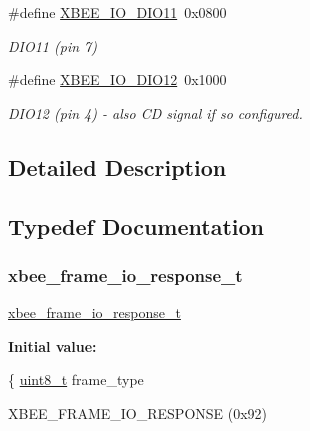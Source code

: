 \begin{DoxyCompactItemize}
\#define \hyperlink{group__xbee__io_ga7c1e80d3412af7f1218b981c5c4e3702}{X\+B\+E\+E\+\_\+\+I\+O\+\_\+\+D\+I\+O11}~0x0800
\begin{DoxyCompactList}\small\item\em D\+I\+O11 (pin 7) \end{DoxyCompactList}\item 
\mbox{\label{group__xbee__io_ga937549281953eb14d221e9f95445d210}} 
\#define \hyperlink{group__xbee__io_ga937549281953eb14d221e9f95445d210}{X\+B\+E\+E\+\_\+\+I\+O\+\_\+\+D\+I\+O12}~0x1000
\begin{DoxyCompactList}\small\item\em D\+I\+O12 (pin 4) -\/ also CD signal if so configured. \end{DoxyCompactList}\end{DoxyCompactItemize}


\subsection{Detailed Description}


\subsection{Typedef Documentation}
\mbox{\label{group__xbee__io_ga91bd181d244760611d0c5292f12bced8}} 
\subsubsection{\texorpdfstring{xbee\+\_\+frame\+\_\+io\+\_\+response\+\_\+t}{xbee\_frame\_io\_response\_t}}
{\footnotesize\ttfamily \hyperlink{group__xbee__io_ga91bd181d244760611d0c5292f12bced8}{xbee\+\_\+frame\+\_\+io\+\_\+response\+\_\+t}}

{\bfseries Initial value\+:}
\begin{DoxyCode}
\{
   \hyperlink{group__hal__dos_gae1affc9ca37cfb624959c866a73f83c2}{uint8\_t}          frame\_type
\end{DoxyCode}


X\+B\+E\+E\+\_\+\+F\+R\+A\+M\+E\+\_\+\+I\+O\+\_\+\+R\+E\+S\+P\+O\+N\+SE (0x92) 



